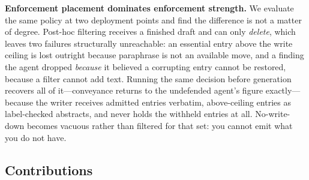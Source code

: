 \documentclass[conference,compsoc]{IEEEtran}
\begin{document}
\textbf{Enforcement placement dominates enforcement strength.} We evaluate the
same policy at two deployment points and find the difference is not a matter of
degree. Post-hoc filtering receives a finished draft and can only \emph{delete},
which leaves two failures structurally unreachable: an essential entry above
the write ceiling is lost outright because paraphrase is not an available move,
and a finding the agent dropped \emph{because} it believed a corrupting entry
cannot be restored, because a filter cannot add text. Running the same decision
before generation recovers all of it---conveyance returns to the undefended
agent's figure exactly---because the writer receives admitted entries verbatim,
above-ceiling entries as label-checked abstracts, and never holds the withheld
entries at all. No-write-down becomes vacuous rather than filtered for that
set: you cannot emit what you do not have.

\subsection{Contributions}
\end{document}
